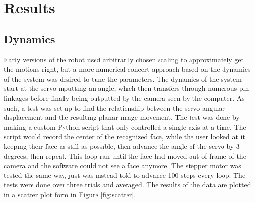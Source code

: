 \chapter{Results}
\section{Dynamics}
Early versions of the robot used arbitrarily chosen scaling to approximately get the motions right, but a more numerical concert approach based on the dynamics of the system was desired to tune the parameters. The dynamics of the system start at the servo inputting an angle, which then transfers through numerous pin linkages before finally being outputted by the camera seen by the computer. As such, a test was set up to find the relationship between the servo angular displacement and the resulting planar image movement. The test was done by making a custom Python script that only controlled a single axis at a time. The script would record the center of the recognized face, while the user looked at it keeping their face as still as possible, then advance the angle of the servo by 3 degrees, then repeat. This loop ran until the face had moved out of frame of the camera and the software could not see a face anymore. The stepper motor was tested the same way, just was instead told to advance 100 steps every loop. The tests were done over three trials and averaged. The results of the data are plotted in a scatter plot form in Figure \ref{fig:scatter}.

